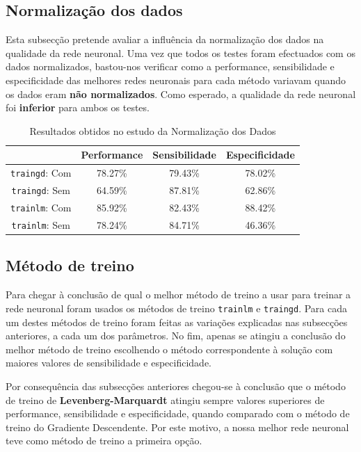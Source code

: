 \documentclass{article}
\begin{document}
\subsection{Normalização dos dados}
Esta subsecção pretende avaliar a influência da normalização dos dados na qualidade da rede neuronal. Uma vez que todos os testes foram efectuados com os dados normalizados, bastou-nos verificar como a performance, sensibilidade e especificidade das melhores redes neuronais para cada método variavam quando os dados eram \textbf{não normalizados}. Como esperado, a qualidade da rede neuronal foi \textbf{inferior} para ambos os testes. 

\begin{table}[!h]
\centering
	\caption{Resultados obtidos no estudo da Normalização dos Dados}
	\label{table_normalization}
	\begin{tabular}{|c|c|c|c|}
	\hline 
	 & \textbf{Performance} & \textbf{Sensibilidade} & \textbf{Especificidade} \\ 
	\hline 
	\texttt{traingd}: Com & 78.27\%  & 79.43\% & 78.02\% \\
	\hline 
	\texttt{traingd}: Sem & 64.59\% & 87.81\% & 62.86\% \\
	\hline
	\texttt{trainlm}: Com & 85.92\% & 82.43\% & 88.42\% \\
	\hline
	\texttt{trainlm}: Sem & 78.24\% & 84.71\% & 46.36\% \\

	\hline    
	\end{tabular}
\end{table}

\subsection{Método de treino}
\indent \indent Para chegar à conclusão de qual o melhor método de treino a usar para treinar a rede neuronal foram usados os métodos de treino \texttt{trainlm} e \texttt{traingd}. Para cada um destes métodos de treino foram feitas as variações explicadas nas subsecções anteriores, a cada um dos parâmetros. No fim, apenas se atingiu a conclusão do melhor método de treino escolhendo o método correspondente à solução com maiores valores de sensibilidade e especificidade.

Por consequência das subsecções anteriores chegou-se à conclusão que o método de treino de \textbf{Levenberg-Marquardt} atingiu sempre valores superiores de performance, sensibilidade e especificidade, quando comparado com o método de treino do Gradiente Descendente. Por este motivo, a nossa melhor rede neuronal teve como método de treino a primeira opção.
\end{document}

